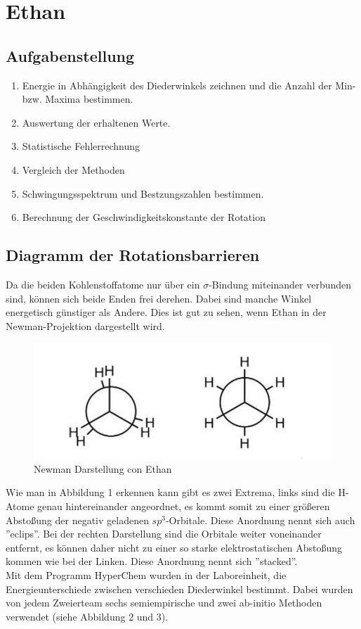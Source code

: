 \section{Ethan}

\subsection{Aufgabenstellung}

\begin{enumerate}
    \item Energie in Abhängigkeit des Diederwinkels zeichnen und die Anzahl der Min- bzw. Maxima bestimmen.
    \item Auswertung der erhaltenen Werte.
    \item Statistische Fehlerrechnung
    \item Vergleich der Methoden 
    \item Schwingungsspektrum und Bestzungszahlen bestimmen.
    \item Berechnung der Geschwindigkeitskonstante der Rotation 
\end{enumerate}

\subsection{Diagramm der Rotationsbarrieren}
Da die beiden Kohlenstoffatome nur über ein $\sigma$-Bindung miteinander verbunden sind, können sich beide Enden frei derehen. Dabei sind 
manche Winkel energetisch günstiger als Andere. Dies ist gut zu sehen, wenn Ethan in der Newman-Projektion dargestellt wird.

\begin{figure}[H]
    \centering
    \includegraphics[scale=.7]{../src/img/newmanEthan.png}
    \caption{Newman Darstellung con Ethan}
\end{figure}

Wie man in Abbildung 1 erkennen kann gibt es zwei Extrema, links sind die H-Atome genau hintereinander angeordnet, es kommt somit zu einer größeren
Abstoßung der negativ geladenen $sp^3$-Orbitale. Diese Anordnung nennt sich auch ''eclips''. Bei der rechten Darstellung sind die Orbitale weiter
voneinander entfernt, es können daher nicht zu einer so starke elektrostatischen Abstoßung kommen wie bei der Linken. Diese Anordnung nennt sich ''stacked''.\\
Mit dem Programm HyperChem wurden in der Laboreinheit, die Energieunterschiede zwischen verschieden Diederwinkel bestimmt. Dabei wurden
von jedem Zweierteam sechs semiempirische und zwei ab-initio Methoden verwendet (siehe Abbildung 2 und 3).

